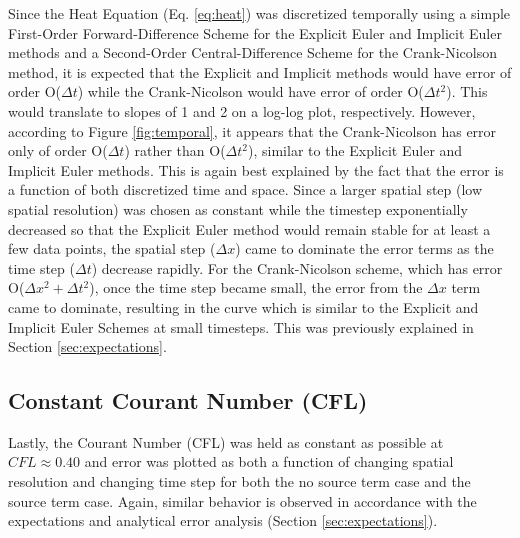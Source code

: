 \documentclass[10pt, letter, showtrims]{extarticle}
\begin{document}
		\noindent
		Since the Heat Equation (Eq. \ref{eq:heat}) was discretized temporally using a simple First-Order Forward-Difference Scheme for the Explicit Euler and Implicit Euler methods and a Second-Order Central-Difference Scheme for the Crank-Nicolson method, it is expected that the Explicit and Implicit methods would have error of order O($\Delta t$) while the Crank-Nicolson would have error of order O($\Delta t^{2}$). This would translate to slopes of 1 and 2 on a log-log plot, respectively. However, according to Figure \ref{fig:temporal}, it appears that the Crank-Nicolson has error only of order O($\Delta t$) rather than O($\Delta t^{2}$), similar to the Explicit Euler and Implicit Euler methods. This is again best explained by the fact that the error is a function of both discretized time and space. Since a larger spatial step (low spatial resolution) was chosen as constant while the timestep exponentially decreased so that the Explicit Euler method would remain stable for at least a few data points, the spatial step ($\Delta x$) came to dominate the error terms as the time step ($\Delta t$) decrease rapidly. For the Crank-Nicolson scheme, which has error O($\Delta x^{2} + \Delta t^{2}$), once the time step became small, the error from the $\Delta x$ term came to dominate, resulting in the curve which is similar to the Explicit and Implicit Euler Schemes at small timesteps. This was previously explained in Section \ref{sec:expectations}.
		
		\pagebreak
		
		\subsection{Constant Courant Number (CFL)}
		
		\noindent
		Lastly, the Courant Number (CFL) was held as constant as possible at $CFL \approx 0.40$ and error was plotted as both a function of changing spatial resolution and changing time step for both the no source term case and the source term case. Again, similar behavior is observed in accordance with the expectations and analytical error analysis (Section \ref{sec:expectations}). 
		
\end{document}
